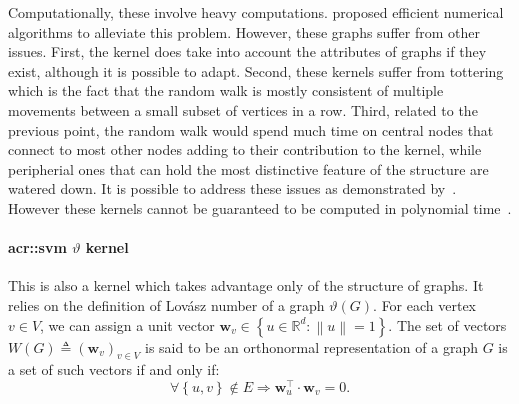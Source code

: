                 Computationally, these involve heavy computations.
                \textcite{vishwanathan2010graph} proposed efficient numerical algorithms to alleviate this problem.
                However, these graphs suffer from other issues.
                First, the kernel does take into account the attributes of graphs if they exist, although it is possible to adapt.
                Second, these kernels suffer from tottering which is the fact that the random walk is mostly consistent of multiple movements between a small subset of vertices in a row.
                Third, related to the previous point, the random walk would spend much time on central nodes that connect to most other nodes adding to their contribution to the kernel, while peripherial ones that can hold the most distinctive feature of the structure are watered down.
                It is possible to address these issues as demonstrated by~\textcite{horvath2004cyclic, mahe2004extensions}.
                However these kernels cannot be guaranteed to be computed in polynomial time~\parencite{vishwanathan2010graph}.

            \paragraph{\gls*{acr::svm} $\vartheta$ kernel}
                This is also a kernel which takes advantage only of the structure of graphs.
                It relies on the definition of Lov\'asz number of a graph $\vartheta(G)$.
                For each vertex $v \in V$, we can assign a unit vector \(\bm{w}_v \in \left\{u \in \mathbb{R}^d: \left\lVert u \right\rVert = 1 \right\}\).
                The set of vectors \(W(G) \triangleq \left(\bm{w}_v\right)_{v \in V}\) is said to be an orthonormal representation of a graph $G$ is a set of such vectors if and only if:
                \begin{equation*}
                    \forall \left\{u,v\right\} \notin E \Rightarrow \bm{w}_u^\intercal\cdot \bm{w}_v=0.
                \end{equation*}

